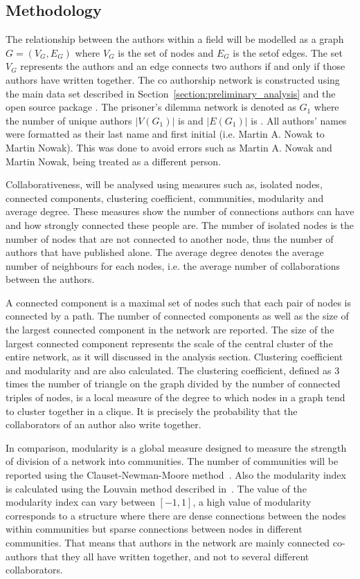 \documentclass{article}
\theoremstyle{definition}
\newcommand{\authors}{}
\newcommand{\edges}{}
\begin{document}
\subsection{Methodology}\label{section:methodology}

The relationship between the authors within a field will be modelled as a graph
\(G = (V_G, E_G)\) where \(V_G\) is the set of nodes and \(E_G\)  is the setof
edges. The set \(V_G\) represents the authors and an edge connects two authors
if and only if those authors have written together. The co authorship network is
constructed using the main data set described in
Section~\ref{section:preliminary_analysis} and the open source package
\cite{networkx}. The prisoner's dilemma network is denoted as \(G_1\) where the
number of unique authors \(|V(G_1)|\) is \authors and \(|E(G_1)|\) is \edges.
All authors' names were formatted as their last name and first initial (i.e.
Martin A. Nowak to Martin Nowak). This was done to avoid errors such as Martin
A. Nowak and Martin Nowak, being treated as a different person.

Collaborativeness, will be analysed using measures such as, isolated nodes,
connected components, clustering coefficient, communities, modularity and average degree.
These measures show the number of connections authors can have
and how strongly connected these people are. The number of isolated nodes is the
number of nodes that are not connected to another node, thus the
number of authors that have published alone. The average degree denotes the average
number of neighbours for each nodes, i.e. the average number of collaborations
between the authors.

A connected component is a maximal set of nodes such that each pair of nodes is
connected by a path. The number of connected components as well as the size of the
largest connected component in the network are reported.
The size of the largest connected component represents the scale of the central cluster
of the entire network, as it will discussed in the analysis section.
Clustering coefficient and modularity and are also calculated. The clustering
coefficient, defined as 3 times the number of triangle on the graph divided
by the number of connected triples of nodes, is a local measure of the degree to
which nodes in a graph tend to cluster together
in a clique. It is precisely the probability that the collaborators
of an author also write together.

In comparison, modularity is a global measure designed to measure the strength of
division of a network into communities. The number of communities will be reported
using the Clauset-Newman-Moore method~\cite{clauset2004}. Also the modularity index
is calculated using the Louvain method described in~\cite{Blondel2008}. The value
of the modularity index can vary between \([-1, 1]\), a high value of modularity
corresponds to a structure where there are dense connections between the nodes within
communities but sparse connections between nodes in different communities.
That means that authors in the network are mainly connected co-authors that they
all have written together, and not to several different collaborators.
\end{document}
